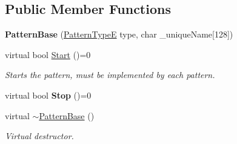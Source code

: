 \subsection*{Public Member Functions}
\begin{DoxyCompactItemize}
\item 
{\bfseries Pattern\+Base} (\hyperlink{namespace_core_1_1_naming_ab40d44ea919ec3e3c8cc05576ba6d610}{Pattern\+TypeE} type, char \+\_\+unique\+Name\mbox{[}128\mbox{]})\hypertarget{class_patterns_1_1_pattern_base_a994d3c33772d78e35ce2fac5f8913f33}{}\label{class_patterns_1_1_pattern_base_a994d3c33772d78e35ce2fac5f8913f33}

\item 
virtual bool \hyperlink{class_patterns_1_1_pattern_base_a4d36988129317f0e32de31ba0ed7982e}{Start} ()=0\hypertarget{class_patterns_1_1_pattern_base_a4d36988129317f0e32de31ba0ed7982e}{}\label{class_patterns_1_1_pattern_base_a4d36988129317f0e32de31ba0ed7982e}

\begin{DoxyCompactList}\small\item\em Starts the pattern, must be implemented by each pattern. \end{DoxyCompactList}\item 
virtual bool {\bfseries Stop} ()=0\hypertarget{class_patterns_1_1_pattern_base_a8bc96ad07ff84226659ed35f71619f89}{}\label{class_patterns_1_1_pattern_base_a8bc96ad07ff84226659ed35f71619f89}

\item 
virtual \hyperlink{class_patterns_1_1_pattern_base_a892f5cd6d58d75bb43e73cc38a3b882e}{$\sim$\+Pattern\+Base} ()\hypertarget{class_patterns_1_1_pattern_base_a892f5cd6d58d75bb43e73cc38a3b882e}{}\label{class_patterns_1_1_pattern_base_a892f5cd6d58d75bb43e73cc38a3b882e}

\begin{DoxyCompactList}\small\item\em Virtual destructor. \end{DoxyCompactList}\end{DoxyCompactItemize}

